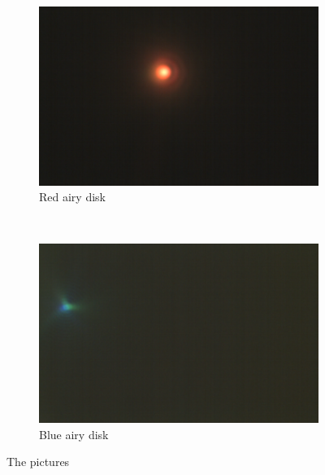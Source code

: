\documentclass[a4paper,12pt]{article}
\begin{document}
\begin{figure}[H]
        \centering
        \begin{subfigure}[H]{0.5\textwidth}
                \includegraphics[width=\textwidth]{red}
                \caption{Red airy disk}
                \label{fig:red airy disk}
        \end{subfigure}%
        ~ %
        \begin{subfigure}[H]{0.5\textwidth}
                \includegraphics[width=\textwidth]{blue}
                \caption{Blue airy disk}
                \label{fig:blue airy disk}
        \end{subfigure}
        \caption{The pictures}\label{fig:Airy disks}
\end{figure}
\end{document}
